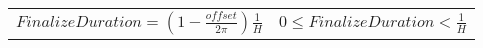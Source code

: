 \documentclass[
  border=2,
  convert={
    density=100 -alpha remove,
    outext=.png
  },
]{standalone}
\begin{document}
\begin{tabular}{l l}
  $
    \displaystyle \mathit{FinalizeDuration}
      = \left(1 - \frac{\mathit{offset}}{2\pi}\right)\frac{1}{H}
  $ & $
    \displaystyle 0 \leq \mathit{FinalizeDuration} < \frac{1}{H}
  $
\end{tabular}
\end{document}
